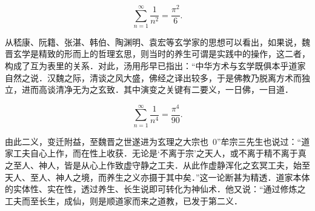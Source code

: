 \begin{equation}\label{key}
\sum_{n=1}^{\infty} \dfrac{1}{n^2} = \dfrac{\pi^2}{6}.
\end{equation}

从嵇康、阮籍、张湛、韩伯、陶渊明、袁宏等玄学家的思想可以看出，如果说，魏晋玄学是精致的形而上的哲理玄思，则当时的养生可谓是实践中的操作，这二者，构成了互为表里的关系．对此，汤用彤早已指出：“中华方术与玄学既俱本乎道家自然之说．汉魏之际，清谈之风大盛，佛经之译出较多，于是佛教乃脱离方术而独立，进而高谈清净无为之玄致．其中演变之关键有二要义，一日佛，一目道．

\begin{equation}\label{key}
\sum_{n=1}^{\infty} \dfrac{1}{n^4} = \dfrac{\pi^4}{90}.
\end{equation}




由此二义，变迁附益，至魏晋之世遂进为玄理之大宗也~0”牟宗三先生也说过：“道家工夫自心上作，而在性上收获．无论是‘不离于宗’之天人，或不离于精不离于真之至人、神人，皆是从心上作致虚守静之工夫．从此作虚静浑化之玄冥工夫，始至天人、至人、神人之境，而养生之义亦摄于其中矣．”这一论断甚为精透．道家本体的实体性、实在性，透过养生、长生说即可转化为神仙术．他又说：“通过修炼之工夫而至长生，成仙，则是顺道家而来之道教，已发于第二义．

